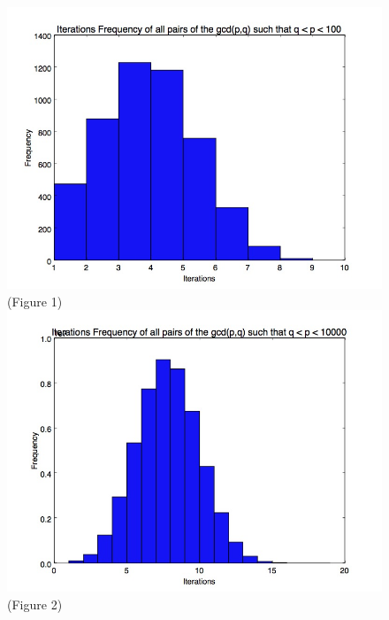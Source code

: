 \documentclass[11pt]{article}
\begin{document}
	\begin{figure}
		
		\includegraphics[scale=.45]{2digit_iterationfreq.jpg}
		\center \tiny(Figure 1)
		\includegraphics[scale=.45]{4digit_iteration_freq.jpg}
		\center \tiny(Figure 2)
	\end{figure}
	
\end{document}
